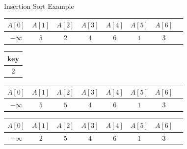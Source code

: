 \begin{frame}{Insertion Sort Example}
\vspace{1cm}
\begin{tabular}{|c|c|c|c|c|c|c|c|}
\hline
$A[0]$ & $A[1]$ & $A[2]$ & $A[3]$ & $A[4]$ & $A[5]$ & $A[6]$\\
\hline
$-\infty$ &\cellcolor{yellow} $5$ &\cellcolor{orange} $2$ & $4$ & $6$ & $1$ & $3$ \\
\hline
\end{tabular}
\vspace{1cm}
\begin{table}[!hbt]
\begin{tabular}{|c|}
\hline key\\
\hline $2$\\
\hline
\end{tabular}\hspace{1cm}
%
\begin{tabular}{|c|c|c|c|c|c|c|c|}
\hline
$A[0]$ & $A[1]$ & $A[2]$ & $A[3]$ & $A[4]$ & $A[5]$ & $A[6]$\\
\hline
$-\infty$ & $5$ &\cellcolor{orange} $5$ & $4$ & $6$ & $1$ & $3$ \\
\hline
\end{tabular}
\end{table}


\begin{tabular}{|c|c|c|c|c|c|c|c|}
\hline
$A[0]$ & $A[1]$ & $A[2]$ & $A[3]$ & $A[4]$ & $A[5]$ & $A[6]$\\
\hline
$-\infty$ & \cellcolor{statalegreen}$2$ &\cellcolor{statalegreen} $5$ & $4$ & $6$ & $1$ & $3$ \\
\hline
\end{tabular}

\end{frame}

